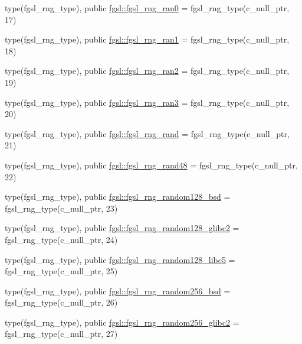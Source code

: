 \begin{DoxyCompactItemize}
type(fgsl\+\_\+rng\+\_\+type), public \hyperlink{namespacefgsl_a355fcde51e3f3a5d6ad8ea548e7cdb0c}{fgsl\+::fgsl\+\_\+rng\+\_\+ran0} = fgsl\+\_\+rng\+\_\+type(c\+\_\+null\+\_\+ptr, 17)
\item 
type(fgsl\+\_\+rng\+\_\+type), public \hyperlink{namespacefgsl_a4b91ddd8f42db11c9ae467f1b8fbe5f2}{fgsl\+::fgsl\+\_\+rng\+\_\+ran1} = fgsl\+\_\+rng\+\_\+type(c\+\_\+null\+\_\+ptr, 18)
\item 
type(fgsl\+\_\+rng\+\_\+type), public \hyperlink{namespacefgsl_a82dd93da12a619eb5cbf8a4d32e44daa}{fgsl\+::fgsl\+\_\+rng\+\_\+ran2} = fgsl\+\_\+rng\+\_\+type(c\+\_\+null\+\_\+ptr, 19)
\item 
type(fgsl\+\_\+rng\+\_\+type), public \hyperlink{namespacefgsl_a2bcafc9c66a493e0ad7ead60bf9d9a0e}{fgsl\+::fgsl\+\_\+rng\+\_\+ran3} = fgsl\+\_\+rng\+\_\+type(c\+\_\+null\+\_\+ptr, 20)
\item 
type(fgsl\+\_\+rng\+\_\+type), public \hyperlink{namespacefgsl_afbedce588830713e9a4f2dfdebe1a262}{fgsl\+::fgsl\+\_\+rng\+\_\+rand} = fgsl\+\_\+rng\+\_\+type(c\+\_\+null\+\_\+ptr, 21)
\item 
type(fgsl\+\_\+rng\+\_\+type), public \hyperlink{namespacefgsl_ae82ea40ab1281a4f6390dc0fd2ba998b}{fgsl\+::fgsl\+\_\+rng\+\_\+rand48} = fgsl\+\_\+rng\+\_\+type(c\+\_\+null\+\_\+ptr, 22)
\item 
type(fgsl\+\_\+rng\+\_\+type), public \hyperlink{namespacefgsl_a398996158c507375c9f2d554deb5d27b}{fgsl\+::fgsl\+\_\+rng\+\_\+random128\+\_\+bsd} = fgsl\+\_\+rng\+\_\+type(c\+\_\+null\+\_\+ptr, 23)
\item 
type(fgsl\+\_\+rng\+\_\+type), public \hyperlink{namespacefgsl_aa3d875270ff8191378a356c1b7aadc43}{fgsl\+::fgsl\+\_\+rng\+\_\+random128\+\_\+glibc2} = fgsl\+\_\+rng\+\_\+type(c\+\_\+null\+\_\+ptr, 24)
\item 
type(fgsl\+\_\+rng\+\_\+type), public \hyperlink{namespacefgsl_a49f71c990dc8dddacbdcdc1a012c4654}{fgsl\+::fgsl\+\_\+rng\+\_\+random128\+\_\+libc5} = fgsl\+\_\+rng\+\_\+type(c\+\_\+null\+\_\+ptr, 25)
\item 
type(fgsl\+\_\+rng\+\_\+type), public \hyperlink{namespacefgsl_aa0a98fef28a7dc6e538ab97f5f07fc22}{fgsl\+::fgsl\+\_\+rng\+\_\+random256\+\_\+bsd} = fgsl\+\_\+rng\+\_\+type(c\+\_\+null\+\_\+ptr, 26)
\item 
type(fgsl\+\_\+rng\+\_\+type), public \hyperlink{namespacefgsl_aca7a71613cf5e355ebfe501bd30a0062}{fgsl\+::fgsl\+\_\+rng\+\_\+random256\+\_\+glibc2} = fgsl\+\_\+rng\+\_\+type(c\+\_\+null\+\_\+ptr, 27)
\item 

\end{DoxyCompactItemize}
